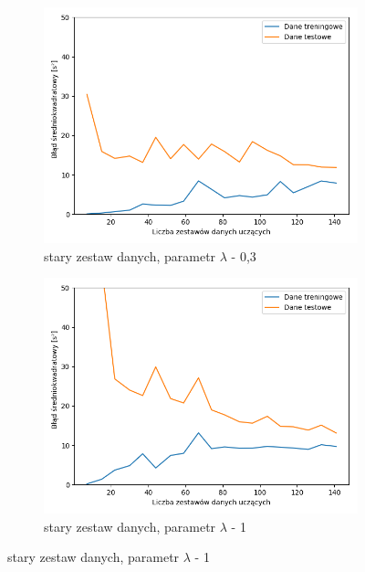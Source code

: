 \documentclass[12pt]{aghdpl}
\begin{document}
		\begin{figure}[h]
			\begin{subfigure}{.5\linewidth}
		 		\includegraphics[width =\linewidth]{wykresy/8_zebranie_wiekszej_ilosci_danych/0-200/regularyzacja_0_3_learning_curves.png}
		 		\caption{stary zestaw danych, parametr $\lambda$ - 0,3}
		 	\end{subfigure}
		 	\begin{subfigure}{.5\linewidth}
		 		\includegraphics[width =\linewidth]{wykresy/8_zebranie_wiekszej_ilosci_danych/0-200/regularyzacja_1_learning_curves.png}
		 		\caption{stary zestaw danych, parametr $\lambda$ - 1}
		 	\end{subfigure}
		

\end{figure}
\end{document}
